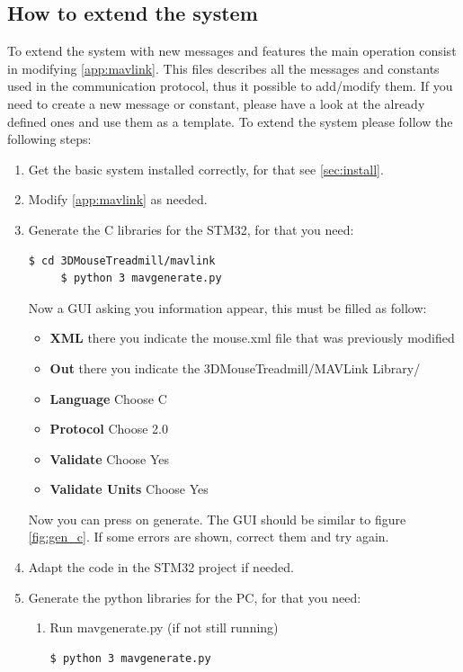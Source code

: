 \documentclass[12pt,a4paper]{article}
\begin{document}
\subsection{How to extend the system}
To extend the system with new messages and features the main operation consist in modifying \ref{app:mavlink}. This files describes all the messages and constants used in the communication protocol, thus it possible to add/modify them. If you need to create a new message or constant, please have a look at the already defined ones and use them as a template. 
To extend the system please follow the following steps:
\begin{enumerate}
	\item Get the basic system installed correctly, for that see \ref{sec:install}.
	\item Modify \ref{app:mavlink} as needed.
	\item Generate the C libraries for the STM32, for that you need:
	 \begin{lstlisting}[style = Bashstyle]
	 $ cd 3DMouseTreadmill/mavlink
	 $ python 3 mavgenerate.py
	 \end{lstlisting}
	 Now a GUI asking you information appear, this must be filled as follow:
	 \begin{itemize}
	 	\item \textbf{XML} there you indicate the mouse.xml file that was previously modified
	 	\item \textbf{Out} there you indicate the 3DMouseTreadmill/MAVLink Library/
	 	\item \textbf{Language} Choose C
	 	\item \textbf{Protocol} Choose 2.0
	 	\item \textbf{Validate} Choose Yes
	 	\item \textbf{Validate Units} Choose Yes
	 \end{itemize}
 	 Now you can press on generate.
 	 The GUI should be similar to figure \ref{fig:gen_c}.
 	 If some errors are shown, correct them and try again.
 	\item Adapt the code in the STM32 project if needed.
 	\item Generate the python libraries for the PC, for that you need:
 	\begin{enumerate}
 		\item Run mavgenerate.py (if not still running)
 		\begin{lstlisting}[style = Bashstyle]
 		$ python 3 mavgenerate.py
 		\end{lstlisting}

\end{enumerate}
\end{enumerate}
\end{document}
